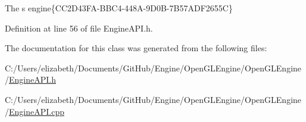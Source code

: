 The s engine\{C\+C2\+D43\+F\+A-\/\+B\+B\+C4-\/448\+A-\/9\+D0\+B-\/7\+B57\+A\+D\+F2655C\} 



Definition at line 56 of file Engine\+A\+P\+I.\+h.



The documentation for this class was generated from the following files\+:\begin{DoxyCompactItemize}
\item 
C\+:/\+Users/elizabeth/\+Documents/\+Git\+Hub/\+Engine/\+Open\+G\+L\+Engine/\+Open\+G\+L\+Engine/\hyperlink{_engine_a_p_i_8h}{Engine\+A\+P\+I.\+h}\item 
C\+:/\+Users/elizabeth/\+Documents/\+Git\+Hub/\+Engine/\+Open\+G\+L\+Engine/\+Open\+G\+L\+Engine/\hyperlink{_engine_a_p_i_8cpp}{Engine\+A\+P\+I.\+cpp}\end{DoxyCompactItemize}
